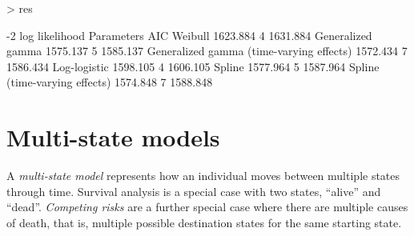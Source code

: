 \documentclass[nojss,nofooter]{jss}
\begin{document}
\begin{Schunk}
\end{Schunk}
\begin{table}[h]
\begin{Schunk}
\begin{Sinput}
> res
\end{Sinput}
\begin{Soutput}
                                         -2 log likelihood Parameters      AIC
Weibull                                           1623.884          4 1631.884
Generalized gamma                                 1575.137          5 1585.137
Generalized gamma (time-varying effects)          1572.434          7 1586.434
Log-logistic                                      1598.105          4 1606.105
Spline                                            1577.964          5 1587.964
Spline (time-varying effects)                     1574.848          7 1588.848
\end{Soutput}
\end{Schunk}
%    
  \caption{Summary of all models fitted to the breast cancer data}
  \label{tab:aic}
\end{table}


\section{Multi-state models}

A \emph{multi-state model} represents how an individual moves between
multiple states through time.  Survival analysis is a special case
with two states, ``alive'' and ``dead''.  \emph{Competing risks} are a
further special case where there are multiple causes of death, that
is, multiple possible destination states for the same starting
state.  
\end{document}
